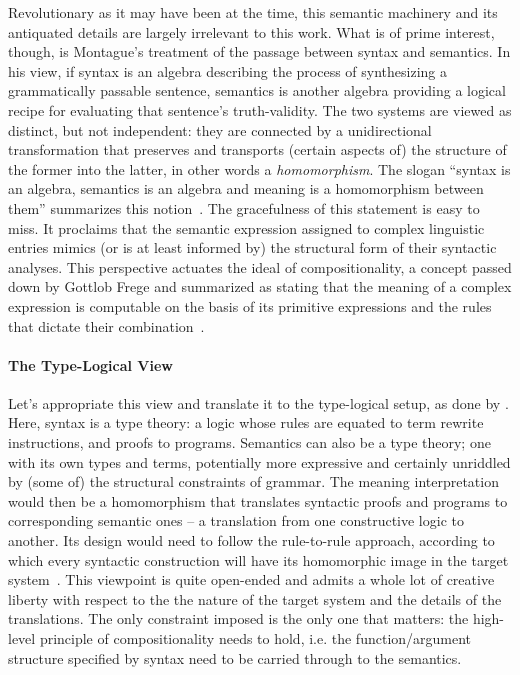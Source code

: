 Revolutionary as it may have been at the time, this semantic machinery and its antiquated details are largely irrelevant to this work.
What is of prime interest, though, is Montague's treatment of the passage between syntax and semantics.
In his view, if syntax is an algebra describing the process of synthesizing a grammatically passable sentence, semantics is another algebra providing a logical recipe for evaluating that sentence's truth-validity.
The two systems are viewed as distinct, but not independent: they are connected by a unidirectional transformation that preserves and transports (certain aspects of) the structure of the former into the latter, in other words a \textit{homomorphism}.
The slogan ``syntax is an algebra, semantics is an algebra and meaning is a homomorphism between them'' summarizes this notion~\cite{janssen2014foundations}.
The gracefulness of this statement is easy to miss. 
It proclaims that the semantic expression assigned to complex linguistic entries mimics (or is at least informed by) the structural form of their syntactic analyses.
This perspective actuates the ideal of compositionality, a concept passed down by Gottlob Frege and summarized as stating that the meaning of a complex expression is computable on the basis of its primitive expressions and the rules that dictate their combination~\cite{partee1984compositionality}.

\paragraph{The Type-Logical View}
Let's appropriate this view and translate it to the type-logical setup, as done by \citet{van1988semantics}.
Here, syntax is a type theory: a logic whose rules are equated to term rewrite instructions, and proofs to programs.
Semantics can also be a type theory; one with its own types and terms, potentially more expressive and certainly unriddled by (some of) the structural constraints of grammar.
The meaning interpretation would then be a homomorphism that translates syntactic proofs and programs to corresponding semantic ones -- a translation from one constructive logic to another.
Its design would need to follow the rule-to-rule approach, according to which every syntactic construction will have its homomorphic image in the target system~\cite{bach1976extension}.
This viewpoint is quite open-ended and admits a whole lot of creative liberty with respect to the the nature of the target system and the details of the translations.
The only constraint imposed is the only one that matters: the high-level principle of compositionality needs to hold, i.e. the function/argument structure specified by syntax need to be carried through to the semantics.

